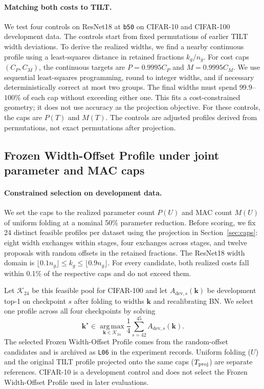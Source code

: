 \documentclass[11pt,a4paper]{article}
\newcommand{\Tilt}{TILT}
\newcommand{\FrozenProfile}{Frozen Width-Offset Profile}
\newcommand{\bfifty}{\texttt{b50}}
\begin{document}
\paragraph{Matching both costs to \Tilt{}.} We test four controls on
ResNet18 at \bfifty{} on CIFAR-10 and CIFAR-100 development data. The controls
start from fixed permutations of earlier \Tilt{} width deviations. To
derive the realized widths, we find a nearby continuous profile using a
least-squares distance in retained fractions $k_g/n_g$. For cost caps
$(C_P,C_M)$, the continuous targets are
$P=0.9995C_P$ and $M=0.9995C_M$. We use sequential least-squares programming,
round to integer widths, and if necessary deterministically correct at
most two groups. The final widths must spend $99.9$--$100\%$ of each cap
without exceeding either one. This fits a cost-constrained geometry; it
does not use accuracy as the projection objective. For these controls, the
caps are $P(T)$ and $M(T)$. The controls are adjusted profiles derived from
permutations, not exact permutations after projection.

\subsection{\FrozenProfile{} under joint parameter and MAC caps}
\label{sec:l06}

\paragraph{Constrained selection on development data.} We set the
caps to the realized parameter count $P(U)$ and MAC count $M(U)$ of uniform
folding at a nominal 50\% parameter reduction. Before scoring, we fix 24
distinct feasible profiles per dataset using the projection in
Section~\ref{sec:caps}: eight width exchanges within stages, four exchanges
across stages, and twelve proposals with random offsets in the retained
fractions. The ResNet18 width domain is
$\lfloor0.1n_g\rfloor\leq k_g\leq\lfloor0.9n_g\rfloor$. For every
candidate, both realized costs fall within 0.1\% of the respective caps
and do not exceed them.

Let $\mathcal K_{24}$ be this feasible pool for CIFAR-100 and let
$A_{\mathrm{dev},s}(\mathbf k)$ be development top-1 on checkpoint $s$
after folding to widths $\mathbf k$ and recalibrating BN. We select one
profile across all four checkpoints by solving
\begin{equation}
 \mathbf k^\star \in \operatorname*{arg\,max}_{\mathbf k\in\mathcal K_{24}}
   \frac{1}{4}\sum_{s=42}^{45} A_{\mathrm{dev},s}(\mathbf k).
 \label{eq:profile-selection}
\end{equation}
The selected \FrozenProfile{} comes from the random-offset candidates
and is archived as \texttt{L06} in the experiment records. Uniform folding ($U$) and the original
\Tilt{} profile projected onto the same caps
($T_{\rm proj}$) are separate references. CIFAR-10 is a development
control and does not select the \FrozenProfile{} used in later evaluations.
\end{document}
